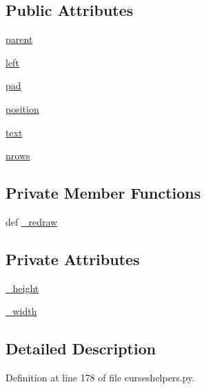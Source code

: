 \subsection*{Public Attributes}
\begin{DoxyCompactItemize}
\item 
\hyperlink{classcurseshelpers_1_1MultiText_ad7d7583f199540d4f6b50bf4d1d37536}{parent}
\item 
\hyperlink{classcurseshelpers_1_1MultiText_af9ed6395122c6150e6ed32ce116766ab}{left}
\item 
\hyperlink{classcurseshelpers_1_1MultiText_a1834ac23773a103bcbe5479dfb10631c}{pad}
\item 
\hyperlink{classcurseshelpers_1_1MultiText_a7f620714a54a56fa9a6d355c38b0bfa9}{position}
\item 
\hyperlink{classcurseshelpers_1_1MultiText_ac0ac8cc9a8a2418f330121f268122e1d}{text}
\item 
\hyperlink{classcurseshelpers_1_1MultiText_a49ee3d9669d20410fc5bca6ae50bb9f4}{nrows}
\end{DoxyCompactItemize}
\subsection*{Private Member Functions}
\begin{DoxyCompactItemize}
\item 
def \hyperlink{classcurseshelpers_1_1MultiText_afd13ee718a0e8c6da731e55636cb1834}{\-\_\-redraw}
\end{DoxyCompactItemize}
\subsection*{Private Attributes}
\begin{DoxyCompactItemize}
\item 
\hyperlink{classcurseshelpers_1_1MultiText_a18fbe454fd99e38f4bc8280936f0c7d4}{\-\_\-height}
\item 
\hyperlink{classcurseshelpers_1_1MultiText_a4b35f36184bba01caa101700d83bdd3b}{\-\_\-width}
\end{DoxyCompactItemize}


\subsection{Detailed Description}


Definition at line 178 of file curseshelpers.\-py.



